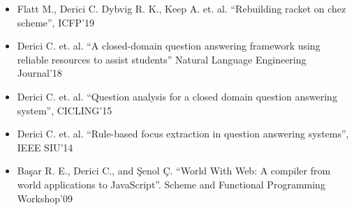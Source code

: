 

\begin{itemize}
\item Flatt M., Derici C. Dybvig R. K., Keep A. et. al. “Rebuilding racket on chez scheme”, ICFP'19

\item Derici C. et. al. “A closed-domain question answering framework using reliable resources to assist students” \newline Natural Language Engineering Journal'18

\item Derici C. et. al. “Question analysis for a closed domain question answering system”, CICLING'15

\item Derici C. et. al. “Rule-based focus extraction in question answering systems”, IEEE SIU'14

\item Başar R. E., Derici C., and Şenol Ç. “World With Web: A compiler from world applications to JavaScript”. Scheme and Functional Programming Workshop'09
\end{itemize}